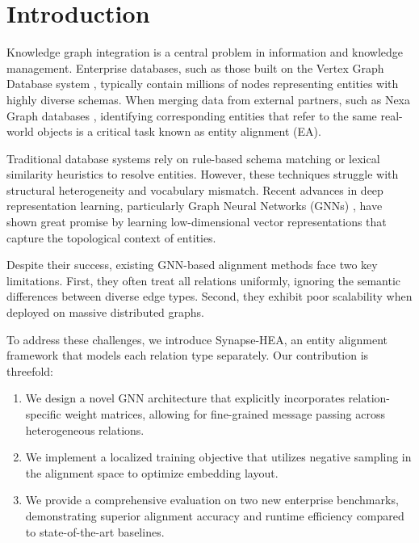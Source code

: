 \section{Introduction}
Knowledge graph integration is a central problem in information and knowledge management. Enterprise databases, such as those built on the Vertex Graph Database system \cite{chen2023vertex}, typically contain millions of nodes representing entities with highly diverse schemas. When merging data from external partners, such as Nexa Graph databases \cite{alfihri2022nexa}, identifying corresponding entities that refer to the same real-world objects is a critical task known as entity alignment (EA).

Traditional database systems rely on rule-based schema matching or lexical similarity heuristics to resolve entities. However, these techniques struggle with structural heterogeneity and vocabulary mismatch. Recent advances in deep representation learning, particularly Graph Neural Networks (GNNs) \cite{smith2021graph}, have shown great promise by learning low-dimensional vector representations that capture the topological context of entities.

Despite their success, existing GNN-based alignment methods face two key limitations. First, they often treat all relations uniformly, ignoring the semantic differences between diverse edge types. Second, they exhibit poor scalability when deployed on massive distributed graphs.

To address these challenges, we introduce Synapse-HEA, an entity alignment framework that models each relation type separately. Our contribution is threefold:
\begin{enumerate}
    \item We design a novel GNN architecture that explicitly incorporates relation-specific weight matrices, allowing for fine-grained message passing across heterogeneous relations.
    \item We implement a localized training objective that utilizes negative sampling in the alignment space to optimize embedding layout.
    \item We provide a comprehensive evaluation on two new enterprise benchmarks, demonstrating superior alignment accuracy and runtime efficiency compared to state-of-the-art baselines.
\end{enumerate}
